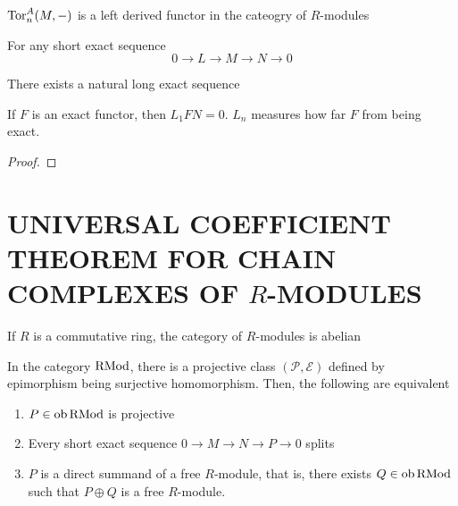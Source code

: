 \begin{remark}
	$\operatorname{Tor}_n^A(M, -)$ is a left derived functor in the cateogry of $R$-modules
\end{remark}

\begin{proposition}
	For any short exact sequence
	$$
		0 \to L \to M \to N \to 0
	$$
	
	There exists a natural long exact sequence
	\begin{center}
	\end{center}
\end{proposition}

\begin{remark}
	If $F$ is an exact functor, then $L_1 F N = 0$. $L_n$ measures how far $F$ from being exact.
\end{remark}

\begin{proof}
\end{proof}

\section{UNIVERSAL COEFFICIENT THEOREM FOR CHAIN COMPLEXES OF $R$-MODULES}

\begin{remark}
	If $R$ is a commutative ring, the category of $R$-modules is abelian
\end{remark}

\begin{remark}
	In the category $\operatorname{RMod}$, there is a projective class $(\mathcal{P}, \mathcal{E})$ defined by epimorphism being surjective homomorphism. Then, the following are equivalent
	\begin{enumerate}
		\item $P \in \operatorname{ob} \operatorname{RMod}$ is projective
		\item Every short exact sequence $0 \to M \to N \to P \to 0$ splits
		\item $P$ is a direct summand of a free $R$-module, that is, there exists $Q \in \operatorname{ob} \operatorname{RMod}$ such that $P \oplus Q$ is a free $R$-module.
	\end{enumerate}    
\end{remark}

